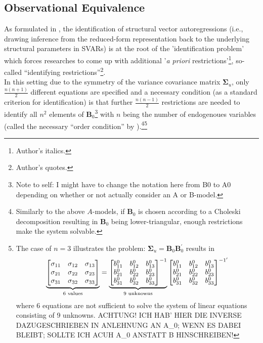 \documentclass[a4paper,11pt,listof=nochaptergap,oneside,pointednumbers,bibtotoc,bigheadings,liststotoc]{scrbook}
\theoremstyle{mysatz}
\theoremstyle{mydefinition}
\theoremstyle{mybemerkung}
\newcommand{\vect}[1]{\boldsymbol{\mathbf{#1}}}
\begin{document}
	
	
\subsection{Observational Equivalence}
As formulated in \citet{rubioetal:10}, the identification of structural vector autoregressions (i.e., drawing inference from the reduced-form representation back to the underlying structural parameters in SVARs) is at the root of the 'identification problem' which forces researches to come up with additional '\textit{a priori} restrictions'\footnote{Author's italics.}, so-called ``identifying restrictions''\footnote{Author's quotes.}.\\
In this setting due to the symmetry of the variance covariance matrix $\vect{\Sigma}_u$, only $\frac{n(n+1)}{2}$ different equations are specified and a necessary condition (as a standard criterion for identification) is that further $\frac{n(n-1)}{2}$ restrictions are needed to identify all $n^2$ elements of $\vect{B}_0$\footnote{Note to self: I might have to change the notation here from B0 to A0 depending on whether or not \citet{ludvigsonetal:18} actually consider an A or B-model.} with $n$ being the number of endogenoues variables (called the necessary ``order condition'' by \citealp{rothenberg:71}).\footnote{Similarly to the above $A$-models, if $\vect{B}_0$ is chosen according to a Choleski decomposition resulting in $\vect{B}_0$ being lower-triangular, enough restrictions make the system solvable.}\footnote{The case of $n=3$ illustrates the problem: $\vect{\Sigma}_u = \vect{B}_0 \vect{B}_0^'$ results in $$		
		\underbrace{%
		\begin{bmatrix}
    		\sigma_{11} & \sigma_{12} & \sigma_{13} \\
		\sigma_{21} & \sigma_{22} & \sigma_{23} \\
		\sigma_{31} & \sigma_{32} & \sigma_{33}
 		\end{bmatrix}
}_{\text{6 values}} = \underbrace{%
		\begin{bmatrix}
    		b_{11}^0 & b_{12}^0 & b_{13}^0 \\
		b_{21}^0 & b_{22}^0 & b_{23}^0 \\
		b_{31}^0 & b_{32}^0 & b_{33}^0
 		\end{bmatrix}^{-1}
}_{\text{9 unknowns}}
\begin{bmatrix}
    		b_{11}^0 & b_{12}^0 & b_{13}^0 \\
		b_{21}^0 & b_{22}^0 & b_{23}^0 \\
		b_{31}^0 & b_{32}^0 & b_{33}^0
 		\end{bmatrix}^{{-1}'}$$ 
		where 6 equations are not sufficient to solve the system of linear equations consisting of 9 unknowns. ACHTUNG! ICH HAB' HIER DIE INVERSE DAZUGESCHRIEBEN IN ANLEHNUNG AN A_0; WENN ES DABEI BLEIBT; SOLLTE ICH ACUH A_0 ANSTATT B HINSCHREIBEN!}\\
\end{document}
